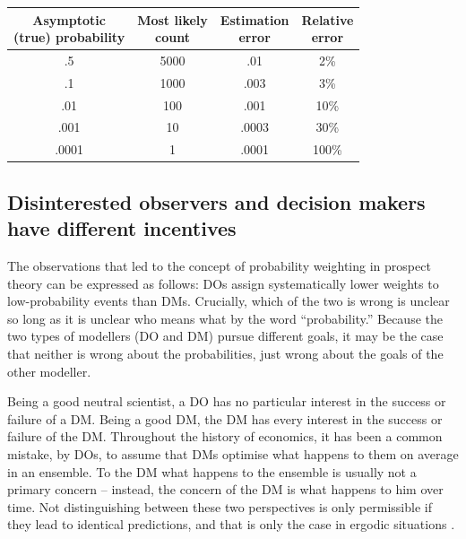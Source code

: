 \documentclass[11pt]{article}
\newcommand{\ra}[1]{\renewcommand{\arraystretch}{#1}}
\newcommand{\tlabel}[1]{\label{tab:#1}}
\numberwithin{equation}{section}
\begin{document}
\begin{table}[!htb]
\ra{1.25}
\centering
{}\tlabel{errors}
\begin{tabular}{@{}cccc@{}}\toprule[2pt]
\makecell{Asymptotic\\(true) probability} & \makecell{Most likely\\count} & \makecell{Estimation\\error} & \makecell{Relative\\error}\\
\midrule[2pt]
.5 & 5000 & .01 & 2\%\\
.1 & 1000& .003 & 3\%\\
.01 & 100& .001 & 10\%\\
.001 & 10& .0003& 30\%\\
.0001 & 1& .0001 &100\%\\
\bottomrule[2pt]
\end{tabular}
\end{table}

\subsection{Disinterested observers and decision makers have different incentives}
The observations that led to the concept of probability weighting in prospect theory can be expressed as follows: DOs assign systematically lower weights to low-probability events than DMs.
Crucially, which of the two is wrong is unclear so long as it is unclear who means what by the word ``probability.'' Because the two types of modellers (DO and DM) pursue different goals, it may be the case that neither is wrong about the probabilities, just wrong about the goals of the other modeller.

Being a good neutral scientist, a DO has no particular interest in the success or failure of a DM. Being a good DM, the DM has every interest in the success or failure of the DM. Throughout the history of economics, it has been a common mistake, by DOs, to assume that DMs optimise what happens to them on average in an ensemble. To the DM what happens to the ensemble is usually not a primary concern -- instead, the concern of the DM is what happens to him over time. Not distinguishing between these two perspectives is only permissible if they lead to identical predictions, and that is only the case in ergodic situations \citep{Peters2019b}. 
\end{document}
